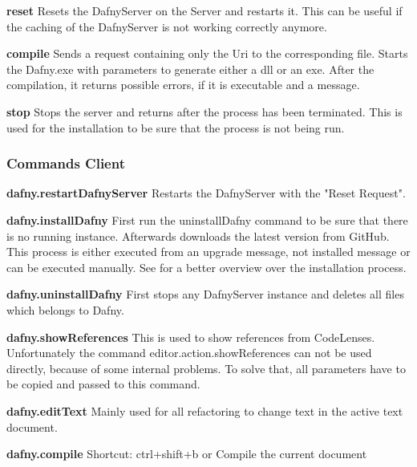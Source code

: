 \textbf{reset}
Resets the DafnyServer on the Server and restarts it. This can be useful if the caching of the DafnyServer is not working correctly anymore. \newline

\textbf{compile}
Sends a request containing only the Uri to the corresponding file. Starts the Dafny.exe with parameters to generate either a dll or an exe. After the compilation, it returns possible errors, if it is executable and a message.\newline

\textbf{stop}
Stops the server and returns after the process has been terminated. This is used for the installation to be sure that the process is not being run. \newline

\subsubsection{Commands Client}

\textbf{dafny.restartDafnyServer}
Restarts the DafnyServer with the "Reset Request".\newline

\textbf{dafny.installDafny}
First run the uninstallDafny command to be sure that there is no running instance. Afterwards downloads the latest version from GitHub. This process is either executed from an upgrade message, not installed message or can be executed manually. 
See  for a better overview over the installation process. \newline

\textbf{dafny.uninstallDafny}
First stops any DafnyServer instance and deletes all files which belongs to Dafny. \newline

\textbf{dafny.showReferences}
This is used to show references from CodeLenses. Unfortunately the command editor.action.showReferences can not be used directly, because of some internal problems. To solve that, all parameters have to be copied and passed to this command. \newline

\textbf{dafny.editText}
Mainly used for all refactoring to change text in the active text document. \newline

\textbf{dafny.compile}
Shortcut: ctrl+shift+b or %
\newline
Compile the current document \newline

